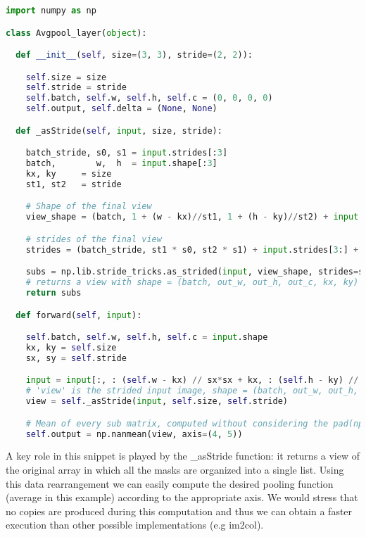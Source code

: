 \documentclass{standalone}
\begin{document}
\lstset{style=snippet}
\begin{lstlisting}[language=Python, caption=NumPyNet version of AvgPool function, label=code:py_avgpool]
import numpy as np

class Avgpool_layer(object):

  def __init__(self, size=(3, 3), stride=(2, 2)):

    self.size = size
    self.stride = stride
    self.batch, self.w, self.h, self.c = (0, 0, 0, 0)
    self.output, self.delta = (None, None)

  def _asStride(self, input, size, stride):

    batch_stride, s0, s1 = input.strides[:3]
    batch,        w,  h  = input.shape[:3]
    kx, ky     = size
    st1, st2   = stride

    # Shape of the final view
    view_shape = (batch, 1 + (w - kx)//st1, 1 + (h - ky)//st2) + input.shape[3:] + (kx, ky)

    # strides of the final view
    strides = (batch_stride, st1 * s0, st2 * s1) + input.strides[3:] + (s0, s1)

    subs = np.lib.stride_tricks.as_strided(input, view_shape, strides=strides)
    # returns a view with shape = (batch, out_w, out_h, out_c, kx, ky)
    return subs

  def forward(self, input):

    self.batch, self.w, self.h, self.c = input.shape
    kx, ky = self.size
    sx, sy = self.stride

    input = input[:, : (self.w - kx) // sx*sx + kx, : (self.h - ky) // sy*sy + ky, ...]
    # 'view' is the strided input image, shape = (batch, out_w, out_h, out_c, kx, ky)
    view = self._asStride(input, self.size, self.stride)

    # Mean of every sub matrix, computed without considering the pad(np.nan)
    self.output = np.nanmean(view, axis=(4, 5))

\end{lstlisting}

A key role in this snippet is played by the \textsf{\_asStride} function: it returns a view of the original array in which all the masks are organized into a single list.
Using this data rearrangement we can easily compute the desired pooling function (average in this example) according to the appropriate axis.
We would stress that no copies are produced during this computation and thus we can obtain a faster execution than other possible implementations (e.g \textsf{im2col}).
\end{document}
